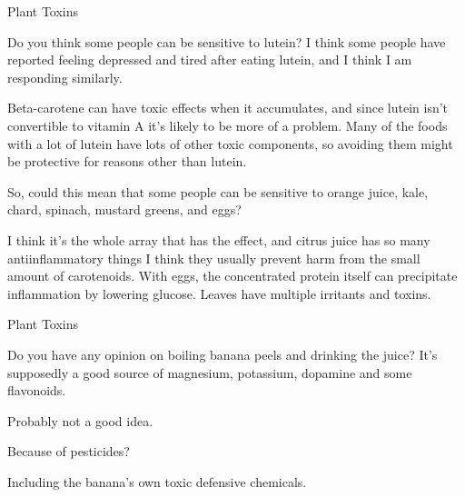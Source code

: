 \documentclass[11pt,oneside,openany,extrafontsizes]{memoir}
\begin{document}
\begin{emailexchange}{Plant Toxins}

    \begin{question}
        Do you think some people can be sensitive to lutein? I think some people have reported feeling depressed and tired after eating lutein, and I think I am responding similarly.
    \end{question}

    \begin{answer}
       Beta-carotene can have toxic effects when it accumulates, and since lutein isn't convertible to vitamin A it's likely to be more of a problem. Many of the foods with a lot of lutein have lots of other toxic components, so avoiding them might be protective for reasons other than lutein.
    \end{answer}
    
    \begin{question}
        So, could this mean that some people can be sensitive to orange juice, kale, chard, spinach, mustard greens, and eggs? 
    \end{question}

    \begin{answer}
      I think it's the whole array that has the effect, and citrus juice has so many antiinflammatory things I think they usually prevent harm from the small amount of carotenoids. With eggs, the concentrated protein itself can precipitate inflammation by lowering glucose. Leaves have multiple irritants and toxins.
    \end{answer}
\end{emailexchange}

\begin{emailexchange}{Plant Toxins}

    \begin{question}
        Do you have any opinion on boiling banana peels and drinking the juice? It's supposedly a good source of magnesium, potassium, dopamine and some flavonoids. 
    \end{question}

    \begin{answer}
      Probably not a good idea.
    \end{answer}

    \begin{question}
        Because of pesticides?
    \end{question}

    \begin{answer}
      Including the banana's own toxic defensive chemicals.
    \end{answer}
\end{emailexchange}
\end{document}
